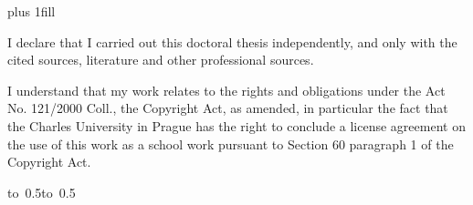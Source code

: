 \documentclass[12pt,a4paper,twoside,openright,natbib]{book}
\begin{document}
\vglue 0pt plus 1fill

\noindent
I declare that I carried out this doctoral thesis independently, and only with the cited sources, literature and other professional sources.

\medskip\noindent
I understand that my work relates to the rights and obligations under the Act No. 121/2000 Coll., the Copyright Act, as amended, in particular the fact that the Charles University in Prague has the right to conclude a license agreement on the use of this work as a school work pursuant to Section 60 paragraph 1 of the Copyright Act.

\vspace{10mm}

\hbox{\hbox to 0.5\hbox to 0.5}

\vspace{20mm}
\newpage

\end{document}
